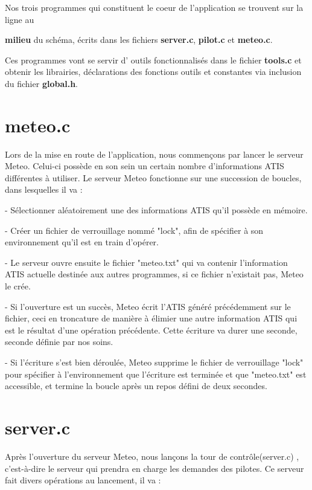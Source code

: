 \documentclass{report}
\begin{document}
		Nos trois programmes qui constituent le coeur de l'application se trouvent sur la ligne au {\textbf{milieu} du schéma, écrits dans les fichiers {\textbf{\color{red} server.c}}, {      \textbf{\color{red} pilot.c}} et {\textbf{\color{red} meteo.c}}.

		Ces programmes vont se servir d' \og outils \fg fonctionnalisés dans le fichier {\textbf{\color{red} tools.c}} et obtenir les librairies, déclarations des fonctions outils et constantes  via inclusion du fichier {\textbf{\color{black} global.h}}.

	\section{meteo.c}

		Lors de la mise en route de l'application, nous commençons par lancer le serveur Meteo.
		Celui-ci possède en son sein un certain nombre d'informations ATIS différentes à utiliser.
		Le serveur Meteo fonctionne sur une succession de boucles, dans lesquelles il va :

		- Sélectionner aléatoirement une des informations ATIS qu'il possède en mémoire.

		- Créer un fichier de verrouillage nommé "lock", afin de spécifier à son environnement qu'il est en train d'opérer.

		- Le serveur ouvre ensuite le fichier "meteo.txt" qui va contenir l'information ATIS actuelle destinée aux autres programmes, si ce fichier n'existait pas, Meteo le crée.

		- Si l'ouverture est un succès, Meteo écrit l'ATIS généré précédemment sur le fichier, ceci en troncature de manière à élimier une autre information ATIS qui est le résultat d'une opération précédente. Cette écriture va durer une seconde, seconde définie par nos soins.

		- Si l'écriture s'est bien déroulée, Meteo supprime le fichier de verrouillage "lock" pour spécifier à l'environnement que l'écriture est terminée et que "meteo.txt" est accessible, et termine la boucle après un repos défini de deux secondes.

	\section{server.c}

		Après l'ouverture du serveur Meteo, nous lançons la tour de contrôle(server.c) , c'est-à-dire le serveur qui prendra en charge les demandes des pilotes.
		Ce serveur fait divers opérations au lancement, il va : 

}
\end{document}
